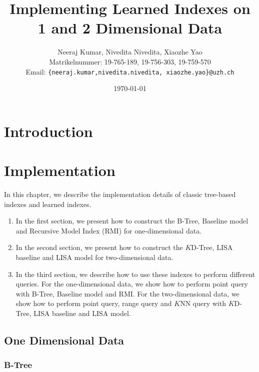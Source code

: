 \documentclass[a4paper,12pt]{scrreprt}
\title{Implementing Learned Indexes on 1 and 2 Dimensional Data}
\author{
  Neeraj Kumar, Nivedita Nivedita, Xiaozhe Yao\\[-5pt]
  \scriptsize Matrikelnummer: 19-765-189, 19-756-303, 19-759-570\\[-5pt]
  \scriptsize Email: \texttt{\{neeraj.kumar,nivedita.nivedita, xiaozhe.yao\}@uzh.ch}
}
\date{\vspace*{2cm}\today}
\newenvironment{mscsummary}{\fbox{Summary}}{\medskip}
\begin{document}
\begingroup
\let\newpage\relax%
\maketitle
\newpage\null\thispagestyle{blank}\newpage
\setcounter{page}{0}
\endgroup

\begin{abstract}

\end{abstract}

\setcounter{tocdepth}{2}
\tableofcontents 

\chapter{Introduction}



\chapter{Implementation}

\begin{mscsummary}
	In this chapter, we describe the implementation details of classic tree-based indexes and learned indexes.
	\begin{enumerate}
		\item In the first section, we present how to construct the B-Tree, Baseline model and Recursive Model Index (RMI) for one-dimensional data.
		\item In the second section, we present how to construct the $K$D-Tree, LISA baseline and LISA model for two-dimensional data.
		\item In the third section, we describe how to use these indexes to perform different queries. For the one-dimensional data, we show how to perform point query with B-Tree, Baseline model and RMI. For the two-dimensional data, we show how to perform point query, range query and $K$NN query with $K$D-Tree, LISA baseline and LISA model.
	\end{enumerate}
\end{mscsummary}

\section{One Dimensional Data}

\subsection{B-Tree}
\end{document}
